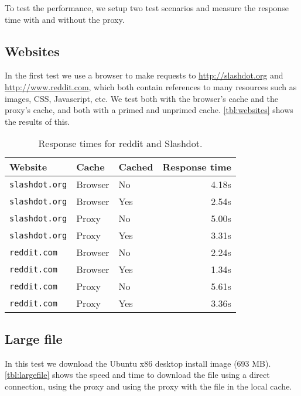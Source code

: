 \documentclass{sig-alternate}
\begin{document}
To test the performance, we setup two test scenarios and measure the response
time with and without the proxy.

\subsection{Websites}
\label{sec:websites}

In the first test we use a browser to make requests to
\url{http://slashdot.org} and \url{http://www.reddit.com}, which both contain
references to many resources such as images, CSS, Javascript, etc. We test
both with the browser's cache and the proxy's cache, and both with a primed
and unprimed cache. \autoref{tbl:websites} shows the results of this.

\begin{table}[h]
    \centering
    \begin{tabular}{|l|l|l||r|}
        \hline
        \bf{Website} & \bf{Cache} & \bf{Cached} & \bf{Response time} \\
        \hline
        \hline
        \texttt{slashdot.org} & Browser & No & 4.18s \\ \hline
        \texttt{slashdot.org} & Browser & Yes & 2.54s \\ \hline
        \texttt{slashdot.org} & Proxy & No & 5.00s \\ \hline
        \texttt{slashdot.org} & Proxy & Yes & 3.31s \\ \hline \hline
        \texttt{reddit.com} & Browser & No & 2.24s \\ \hline
        \texttt{reddit.com} & Browser & Yes & 1.34s \\ \hline
        \texttt{reddit.com} & Proxy & No & 5.61s \\ \hline
        \texttt{reddit.com} & Proxy & Yes & 3.36s \\ \hline
    \end{tabular}
    \caption{Response times for reddit and Slashdot.}
    \label{tbl:websites}
\end{table}

\subsection{Large file}
\label{sec:largefile}

In this test we download the Ubuntu x86 desktop install image (693 MB).
\autoref{tbl:largefile} shows the speed and time to download the file using a
direct connection, using the proxy and using the proxy with the file in the
local cache.
\end{document}
